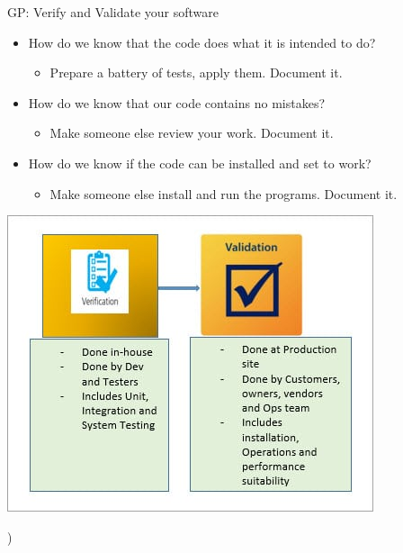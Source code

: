\documentclass[ignorenonframetext,]{beamer}
\providecommand{\tightlist}{%
  \setlength{\itemsep}{0pt}\setlength{\parskip}{0pt}}
\begin{document}
\begin{frame}{%
\protect\hypertarget{gp-verify-and-validate-your-software}{%
GP: Verify and Validate your software}}

\begin{itemize}
\tightlist
\item
  How do we know that the code does what it is intended to do?

  \begin{itemize}
  \tightlist
  \item
    Prepare a battery of tests, apply them. Document it.
  \end{itemize}
\item
  How do we know that our code contains no mistakes?

  \begin{itemize}
  \tightlist
  \item
    Make someone else review your work. Document it.
  \end{itemize}
\item
  How do we know if the code can be installed and set to work?

  \begin{itemize}
  \tightlist
  \item
    Make someone else install and run the programs. Document it.
  \end{itemize}
\end{itemize}

\begin{center}
\includegraphics[height=0.5\textwidth]{"images/Verification-and-Validation"}
\end{center}

)

\end{frame}
\end{document}
